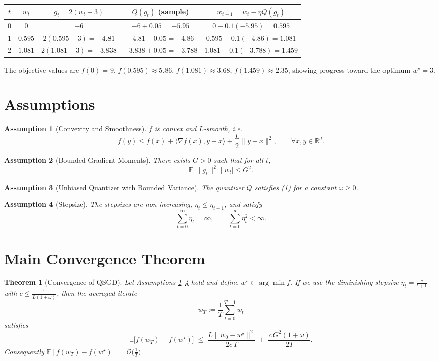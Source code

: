 \documentclass{article}
\newtheorem{theorem}{Theorem}
\newtheorem{assumption}{Assumption}
\begin{document}
\begin{center}
\begin{tabular}{c|c|c|c|c}
$t$ & $w_t$ & $g_t=2(w_t-3)$ & $Q(g_t)$ (sample) & $w_{t+1}=w_t-\eta Q(g_t)$ \\ \hline
0 & $0$ & $-6$ & $-6+0.05=-5.95$ & $0-0.1(-5.95)=0.595$ \\
1 & $0.595$ & $2(0.595-3)=-4.81$ & $-4.81-0.05=-4.86$ & $0.595-0.1(-4.86)=1.081$ \\
2 & $1.081$ & $2(1.081-3)=-3.838$ & $-3.838+0.05=-3.788$ & $1.081-0.1(-3.788)=1.459$ \\
\end{tabular}
\end{center}
The objective values are $f(0)=9$, $f(0.595)\approx5.86$, $f(1.081)\approx3.68$, $f(1.459)\approx2.35$, showing progress toward the optimum $w^\star=3$.

\newpage
\section*{Assumptions}
\begin{assumption}[Convexity and Smoothness]\label{ass:convex}
$f$ is convex and $L$‑smooth, i.e.
\[
f(y)\le f(x)+\langle\nabla f(x),y-x\rangle+\frac{L}{2}\|y-x\|^2,\qquad\forall x,y\in\mathbb{R}^d.
\tag{A1}
\]
\end{assumption}
\begin{assumption}[Bounded Gradient Moments]\label{ass:grad}
There exists $G>0$ such that for all $t$,
\[
\mathbb{E}\!\big[\|g_t\|^2\mid w_t\big]\le G^2 .
\tag{A2}
\]
\end{assumption}
\begin{assumption}[Unbiased Quantizer with Bounded Variance]\label{ass:quant}
The quantizer $Q$ satisfies (1) for a constant $\omega\ge0$.
\end{assumption}
\begin{assumption}[Stepsize]\label{ass:step}
The stepsizes are non‑increasing, $\eta_t\le \eta_{t-1}$, and satisfy
\[
\sum_{t=0}^{\infty}\eta_t=\infty,\qquad
\sum_{t=0}^{\infty}\eta_t^2<\infty .
\tag{A4}
\]
\end{assumption}

\section*{Main Convergence Theorem}
\begin{theorem}[Convergence of QSGD]\label{thm:convergence}
Let Assumptions \ref{ass:convex}–\ref{ass:step} hold and define $w^\star\in\arg\min f$.  
If we use the diminishing stepsize $\eta_t=\frac{c}{t+1}$ with $c\le\frac{1}{L(1+\omega)}$, then the averaged iterate 
\[
\bar w_T:=\frac{1}{T}\sum_{t=0}^{T-1}w_t
\]
satisfies
\[
\mathbb{E}\!\big[f(\bar w_T)-f(w^\star)\big]
\;\le\;
\frac{L\|w_0-w^\star\|^2}{2c\,T}
\;+\;
\frac{c\,G^2(1+\omega)}{2T}.
\tag{2}
\]
Consequently $\mathbb{E}[f(\bar w_T)-f(w^\star)]=\mathcal{O}\!\big(\tfrac{1}{T}\big)$.
\end{theorem}
\end{document}
